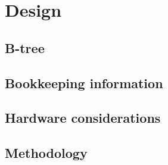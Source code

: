 \chapter{Design}

    \section{B-tree}

    \section{Bookkeeping information}

    \section{Hardware considerations}

    \section{Methodology}
